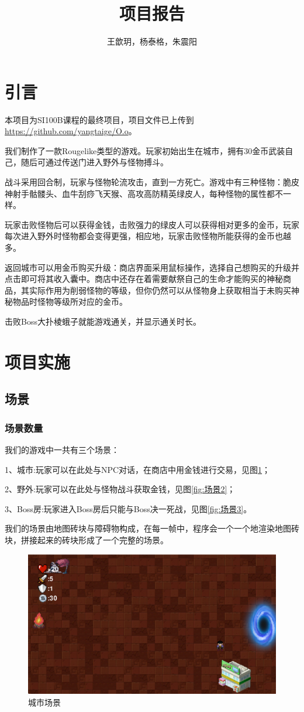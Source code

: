 \documentclass{ctexart}
\title{项目报告}
\author{王歆玥，杨泰格，朱震阳}
\begin{document}
\maketitle

\section{引言}

本项目为SI100B课程的最终项目，项目文件已上传到\href{https://github.com/yangtaige/O.o}{https://github.com/yangtaige/O.o}。

我们制作了一款Rougelike类型的游戏。玩家初始出生在城市，拥有30金币武装自己，随后可通过传送门进入野外与怪物搏斗。

战斗采用回合制，玩家与怪物轮流攻击，直到一方死亡。游戏中有三种怪物：脆皮神射手骷髅头、血牛刮痧飞天猴、高攻高防精英绿皮人，每种怪物的属性都不一样。
    
玩家击败怪物后可以获得金钱，击败强力的绿皮人可以获得相对更多的金币，玩家每次进入野外时怪物都会变得更强，相应地，玩家击败怪物所能获得的金币也越多。
    
返回城市可以用金币购买升级：商店界面采用鼠标操作，选择自己想购买的升级并点击即可将其收入囊中。商店中还存在着需要献祭自己的生命才能购买的神秘商品，其实际作用为削弱怪物的等级，但你仍然可以从怪物身上获取相当于未购买神秘物品时怪物等级所对应的金币。
    
击败Boss大扑棱蛾子就能游戏通关，并显示通关时长。

\section{项目实施}

\subsection{场景}
\subsubsection{场景数量}
我们的游戏中一共有三个场景：

1、城市:玩家可以在此处与NPC对话，在商店中用金钱进行交易，见图\ref{fig:场景1}；

2、野外:玩家可以在此处与怪物战斗获取金钱，见图\ref{fig:场景2}；

3、Boss房:玩家进入Boss房后只能与Boss决一死战，见图\ref{fig:场景3}。

我们的场景由地图砖块与障碍物构成，在每一帧中，程序会一个一个地渲染地图砖块，拼接起来的砖块形成了一个完整的场景。
\begin{figure}
\centering
\includegraphics[width=0.7\linewidth]{场景1.png}
\caption{\label{fig:场景1}城市场景}
\end{figure}
\end{document}

